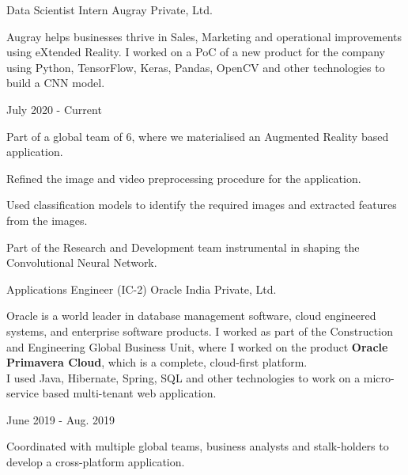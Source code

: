 \begin{cventries}
  \cvexperience
    {Data Scientist Intern}
    {Augray Private, Ltd.}
    {}
    {
    \begin{cvitems}
    \hspace{-2ex}
        Augray helps businesses thrive in Sales, Marketing and operational improvements using eXtended Reality. I worked on a PoC of a new product for the company using Python, TensorFlow, Keras, Pandas, OpenCV and other technologies to build a CNN model.
    \end{cvitems}
    \vspace{-2ex}
    }
    {July 2020 - Current}
    {
      \begin{cvitems}
        \item {Part of a global team of 6, where we materialised an Augmented Reality based application.}
        \item {Refined the image and video preprocessing procedure for the application.}
        \item {Used classification models to identify the required images and extracted features from the images.}
        \item {Part of the Research and Development team instrumental in shaping the Convolutional Neural Network.}
      \end{cvitems}
    }
  \cvexperience
    {Applications Engineer (IC-2)}
    {Oracle India Private, Ltd.}
    {}
    {
    \begin{cvitems}
    \hspace{-2ex}
        Oracle is a world leader in database management software, cloud engineered systems, and enterprise software products. I worked as part of the Construction and Engineering Global Business Unit, where I worked on the product \textbf{Oracle Primavera Cloud}, which is a complete, cloud-first platform.\\
        I used Java, Hibernate, Spring, SQL and other technologies to work on a micro-service based multi-tenant web application.
    \end{cvitems}
    \vspace{-2ex}
    }
    {June 2019 - Aug. 2019}
    {
      \begin{cvitems}
        \item {Coordinated with multiple global teams, business analysts and stalk-holders to develop a cross-platform application.}

\end{cvitems}}
\end{cventries}
